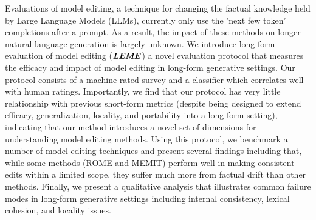 Evaluations of model editing, a technique for changing the factual knowledge held by Large Language Models (LLMs), currently only use the 'next few token' completions after a prompt. As a result, the impact of these methods on longer natural language generation is largely unknown.  We introduce long-form evaluation of model editing ($\textbf{\textit{LEME}}$) a novel evaluation protocol that measures the efficacy and impact of model editing in long-form generative settings. Our protocol consists of a machine-rated survey and a classifier which correlates well with human ratings. Importantly, we find that our protocol has very little relationship with previous short-form metrics (despite being designed to extend efficacy, generalization, locality, and portability into a long-form setting), indicating that our method introduces a novel set of dimensions for understanding model editing methods. Using this protocol, we benchmark a number of model editing techniques and present several findings including that, while some methods (ROME and MEMIT) perform well in making consistent edits within a limited scope, they suffer much more from factual drift than other methods. Finally, we present a qualitative analysis that illustrates common failure modes in long-form generative settings including internal consistency, lexical cohesion, and locality issues.